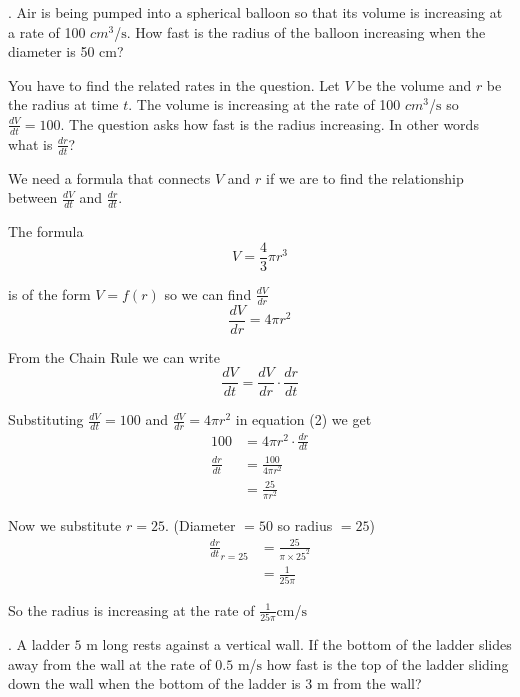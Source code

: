 . Air is being pumped into a spherical balloon so that its volume is increasing at a rate of 100 $cm^{3}$/$\mbox{s}$. How fast is the radius of
the balloon increasing when the diameter is 50 $\mbox{cm}$? 

You have to find the related rates in the question. Let
$V$ be the volume and $r$ be the radius at time $t$. The volume is increasing at the rate of 100 $cm^{3}$/$\mbox{s}$ so $\frac{d V}{d t} =100$. The question asks how fast is the radius increasing. In
other words what is $\frac{d r}{d t}$? 

\solution We need a formula that connects $V$ and $r$ if we are to find the relationship between $\frac{d V}{d t}$ and $\frac{d r}{d t}$. 

The formula
\begin{equation*}V =\frac{4}{3} \pi  r^{3}
\end{equation*}

is of the form $V =f (r)$ so we can find $\frac{d V}{d r}$
\begin{equation}\frac{d V}{d r} =4 \pi  r^{2}\tag{1}
\end{equation}

From the Chain Rule we can write
\begin{equation}\frac{d V}{d t} =\frac{d V}{d r} \cdot \frac{d r}{d t}\tag{2}
\end{equation}

Substituting $\frac{d V}{d t} =100$ and $\frac{d V}{d r} =4 \pi  r^{2}$ in equation (2) we get
\begin{align*}100 &  = 4 \pi  r^{2} \cdot \frac{d r}{d t} \\
\frac{d r}{d t} &  = \frac{100}{4 \pi  r^{2}} \\
 &  = \frac{25}{\pi  r^{2}}\end{align*}

Now we substitute $r =25$. (Diameter $ =50$ so radius $ =25$)
\begin{align*}\frac{d r}{d t}_{r =25} &  = \frac{25}{\pi  \times 25^{2}} \\
 &  = \frac{1}{25 \pi }\end{align*}

So the radius is increasing at the rate of $\frac{1}{25 \pi } \mbox{cm}$/$\mbox{s}$ 

. A ladder $5$ $\mbox{m}$ long rests against a vertical wall. If
the bottom of the ladder slides away from the wall at the rate of $0.5$ $\mbox{m}$/$\mbox{s}$ how fast is the top of the ladder sliding down the wall when the bottom
of the ladder is $3$ $\mbox{m}$ from the wall? 

